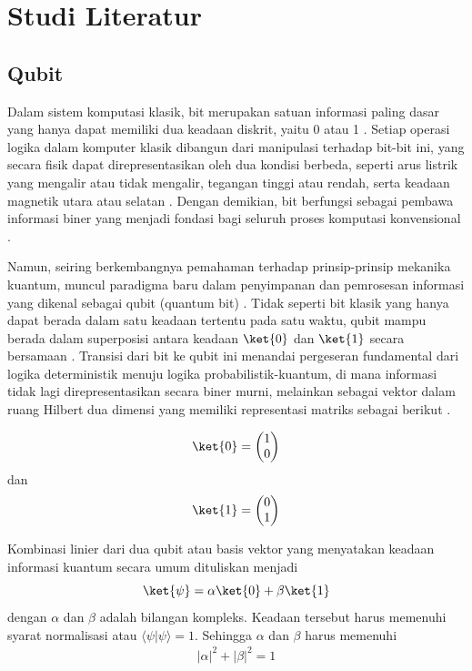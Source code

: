 \chapter{Studi Literatur}

\section{Qubit}
\par
Dalam sistem komputasi klasik, bit merupakan satuan informasi paling dasar yang hanya dapat memiliki dua keadaan diskrit, yaitu 0 atau 1 \cite{nielsen2010quantum}. Setiap operasi logika dalam komputer klasik dibangun dari manipulasi terhadap bit-bit ini, yang secara fisik dapat direpresentasikan oleh dua kondisi berbeda, seperti arus listrik yang mengalir atau tidak mengalir, tegangan tinggi atau rendah, serta keadaan magnetik utara atau selatan \cite{tanenbaum2013structured}. Dengan demikian, bit berfungsi sebagai pembawa informasi biner yang menjadi fondasi bagi seluruh proses komputasi konvensional \cite{shannon1948mathematical}.
\par
Namun, seiring berkembangnya pemahaman terhadap prinsip-prinsip mekanika kuantum, muncul paradigma baru dalam penyimpanan dan pemrosesan informasi yang dikenal sebagai qubit (quantum bit) \cite{nielsen2010quantum}. Tidak seperti bit klasik yang hanya dapat berada dalam satu keadaan tertentu pada satu waktu, qubit mampu berada dalam superposisi antara keadaan $\ket{0}$ dan $\ket{1}$ secara bersamaan \cite{dirac1981principles}. Transisi dari bit ke qubit ini menandai pergeseran fundamental dari logika deterministik menuju logika probabilistik-kuantum, di mana informasi tidak lagi direpresentasikan secara biner murni, melainkan sebagai vektor dalam ruang Hilbert dua dimensi yang memiliki representasi matriks sebagai berikut \cite{sakurai2017modern}.

\begin{align*}
    \ket{0} = \begin{pmatrix} 1 \\ 0 \end{pmatrix}
\end{align*}
dan
\begin{align*}
    \ket{1} = \begin{pmatrix} 0 \\ 1 \end{pmatrix}
\end{align*}
\par
Kombinasi linier dari dua qubit atau basis vektor yang menyatakan keadaan informasi kuantum secara umum dituliskan menjadi
\begin{equation}
\ket{\psi} = \alpha \ket{0} + \beta \ket{1}
\end{equation}
dengan $\alpha$ dan $\beta$ adalah bilangan kompleks. Keadaan tersebut harus memenuhi syarat normalisasi atau $\langle \psi | \psi \rangle = 1$. Sehingga $\alpha$ dan $\beta$ harus memenuhi
\begin{align*}
|\alpha|^2 + |\beta|^2 = 1
\end{align*}


